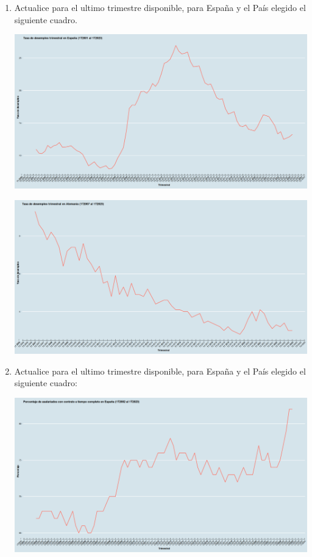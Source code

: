 \begin{enumerate}
\newpage

    \item Actualice para el ultimo trimestre disponible, para España y el País elegido el siguiente cuadro.

	\begin{center}
	    \includegraphics[scale=0.27]{image/tasa_desempleo.png}
	\end{center}
	\begin{center}
	    \includegraphics[scale=0.27]{image/tasa_desempleoA.png}
	\end{center}
	\vspace{.5cm}

\newpage

    \item  Actualice para el ultimo trimestre disponible, para España y el País elegido el siguiente cuadro:

	\begin{center}
	    \includegraphics[scale=0.26]{image/porcentaje_asalariados_completo.png}
	\end{center}
	\vspace{.5cm}


\end{enumerate}
